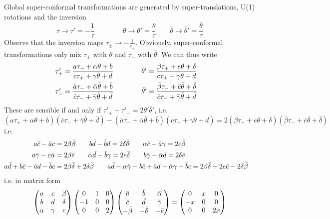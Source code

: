 \documentclass[aps,pre,preprint,onecolumn,citeautoscript,superscriptaddress,nofootinbib,eqsecnum]{revtex4-1}
\begin{document}
Global super-conformal transformations are generated by super-translations, U(1) rotations and the inversion 
\begin{equation}
\tau \to \tau' =-\frac{1}{\tau}  \qquad \qquad \theta \to \theta' = \frac{\theta}{\tau} \qquad \bar \theta \to \bar \theta' = \frac{\bar \theta}{\tau} 
\end{equation}
Observe that the inversion maps $\tau_\pm \to -\frac{1}{\tau_\pm}$.
Obviously, super-conformal transformations only mix $\tau_+$ with $\theta$ and $\tau_-$ with $\bar \theta$. We can thus write
\begin{align}
\tau'_+ &= \frac{a \tau_+ + \alpha \theta + b}{c \tau_+ + \gamma \theta + d} \qquad \qquad \theta' = \frac{\beta \tau_+ + e \theta + \delta}{c \tau_+ + \gamma \theta + d} \cr
\tau'_- &= \frac{\bar a \tau_- + \bar \alpha \bar \theta + \bar b}{\bar c \tau_- + \bar \gamma \bar \theta + \bar d} \qquad \qquad \bar \theta' = \frac{\bar \beta \tau_- + \bar e \bar \theta + \bar \delta}{\bar c \tau_- + \bar \gamma \bar \theta + \bar d} 
\end{align}
These are sensible if and only if $\tau'_+ - \tau'_- = 2 \theta' \bar \theta'$, i.e. 
\begin{equation}
(a \tau_+ + \alpha \theta + b)(\bar c \tau_- + \bar \gamma \bar \theta + \bar d) - (\bar a \tau_- + \bar \alpha \bar \theta + \bar b)(c \tau_+ + \gamma \theta + d) = 2 (\beta \tau_+ + e \theta + \delta)(\bar \beta \tau_- + \bar e \bar \theta + \bar \delta)
\end{equation}
i.e.
\begin{align}
a \bar c - \bar a c &= 2 \beta \bar \beta \qquad 
b \bar d - \bar b d = 2\delta \bar \delta \qquad
\alpha \bar c - \bar a \gamma = 2 e \bar \beta \cr
a \bar \gamma - c \bar \alpha &= 2 \beta \bar e \qquad 
\alpha \bar d - \bar b \gamma = 2 e \bar \delta \qquad
b \bar \gamma - \bar \alpha d = 2 \delta \bar e \cr
a \bar d + b \bar c - \bar a d - \bar b c &= 2 \beta \bar \delta + 2 \delta \bar \beta \qquad 
a \bar d - \alpha \bar \gamma - b \bar c + \bar a d - \bar \alpha \gamma - \bar b c = 2 \beta \bar \delta + 2 e \bar e- 2 \delta \bar \beta
 \end{align}
i.e. in matrix form
\begin{equation}
\begin{pmatrix} a & c & \beta \cr b & d & \delta \cr \alpha & \gamma& e \end{pmatrix}\begin{pmatrix} 0 & 1 & 0 \cr -1 & 0 & 0 \cr 0 & 0& 2 \end{pmatrix}\begin{pmatrix}  \bar a &  \bar b &  \bar \alpha \cr \bar c & \bar d & \bar \gamma \cr  - \bar \beta & - \bar \delta & - \bar e \end{pmatrix} = \begin{pmatrix} 0 & x & 0 \cr -x & 0 & 0 \cr 0 & 0& 2x \end{pmatrix}
\end{equation}
\end{document}
